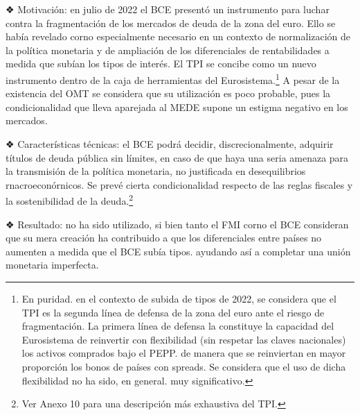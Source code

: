 \documentclass[10pt,a4paper]{article}
\begin{document}
{{❖ Motivación: en julio de 2022 el BCE presentó un instrumento para luchar contra la fragmentación de los mercados de deuda de la zona del euro. Ello se había revelado corno especialmente necesario en un contexto de normalización de la política monetaria y de ampliación de los diferenciales de rentabilidades a medida que subían los tipos de interés. El TPI se concibe como un nuevo instrumento dentro de la caja de herramientas del Eurosistema.\footnote{%
    En puridad. en el contexto de subida de tipos de 2022, se considera que el TPI es la segunda línea de defensa de la zona del euro ante el riesgo de fragmentación. La primera línea de defensa la constituye la capacidad del Eurosistema de reinvertir con flexibilidad (sin respetar las claves nacionales) los activos comprados bajo el PEPP. de manera que se reinviertan en mayor proporción los bonos de países con spreads. Se considera que el uso de dicha flexibilidad no ha sido, en general. muy significativo.
} A pesar de la existencia del OMT se considera que su utilización es poco probable, pues la condicionalidad que lleva aparejada al MEDE supone un estigma negativo en los mercados.

❖ Características técnicas: el BCE podrá decidir, discrecionalmente, adquirir títulos de deuda pública sin límites, en caso de que haya una seria amenaza para la transmisión de la política monetaria, no justificada en desequilibrios rnacroeconórnicos. Se prevé cierta condicionalidad respecto de las reglas fiscales y la sostenibilidad de la deuda.\footnote{Ver Anexo 10 para una descripción más exhaustiva del TPI.
}

❖ Resultado: no ha sido utilizado, si bien tanto el FMI corno el BCE consideran que su mera creación ha contribuido a que los diferenciales entre países no aumenten a medida que el BCE subía tipos. ayudando así a completar una unión monetaria imperfecta.








































}}
\end{document}
